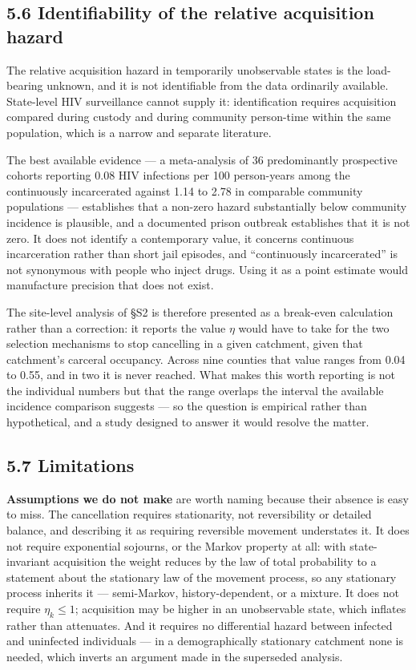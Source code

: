 \subsection{5.6 Identifiability of the relative acquisition hazard}

The relative acquisition hazard in temporarily unobservable states is the load-bearing unknown, and it is not identifiable from the data ordinarily available. State-level HIV surveillance cannot supply it: identification requires acquisition compared during custody and during community person-time within the same population, which is a narrow and separate literature.

The best available evidence --- a meta-analysis of 36 predominantly prospective cohorts reporting 0.08 HIV infections per 100 person-years among the continuously incarcerated against 1.14 to 2.78 in comparable community populations --- establishes that a non-zero hazard substantially below community incidence is plausible, and a documented prison outbreak establishes that it is not zero. It does not identify a contemporary value, it concerns continuous incarceration rather than short jail episodes, and ``continuously incarcerated'' is not synonymous with people who inject drugs. Using it as a point estimate would manufacture precision that does not exist.

The site-level analysis of §S2 is therefore presented as a break-even calculation rather than a correction: it reports the value \(\eta\) would have to take for the two selection mechanisms to stop cancelling in a given catchment, given that catchment's carceral occupancy. Across nine counties that value ranges from 0.04 to 0.55, and in two it is never reached. What makes this worth reporting is not the individual numbers but that the range overlaps the interval the available incidence comparison suggests --- so the question is empirical rather than hypothetical, and a study designed to answer it would resolve the matter.

\subsection{5.7 Limitations}

\textbf{Assumptions we do not make} are worth naming because their absence is easy to miss. The cancellation requires stationarity, not reversibility or detailed balance, and describing it as requiring reversible movement understates it. It does not require exponential sojourns, or the Markov property at all: with state-invariant acquisition the weight reduces by the law of total probability to a statement about the stationary law of the movement process, so any stationary process inherits it --- semi-Markov, history-dependent, or a mixture. It does not require \(\eta_k\le1\); acquisition may be higher in an unobservable state, which inflates rather than attenuates. And it requires no differential hazard between infected and uninfected individuals --- in a demographically stationary catchment none is needed, which inverts an argument made in the superseded analysis.

